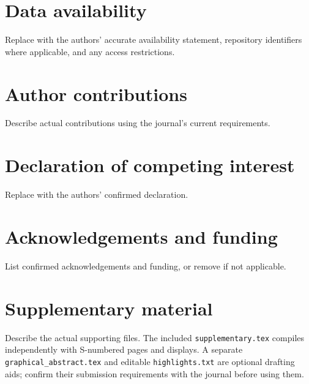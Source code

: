 \documentclass[a4paper,preprint,12pt]{elsarticle}
\begin{document}
\section*{Data availability}
Replace with the authors' accurate availability statement, repository
identifiers where applicable, and any access restrictions.
\section*{Author contributions}
Describe actual contributions using the journal's current requirements.
\section*{Declaration of competing interest}
Replace with the authors' confirmed declaration.
\section*{Acknowledgements and funding}
List confirmed acknowledgements and funding, or remove if not applicable.
\section*{Supplementary material}
Describe the actual supporting files. The included \texttt{supplementary.tex}
compiles independently with S-numbered pages and displays. A separate
\texttt{graphical\_abstract.tex} and editable \texttt{highlights.txt} are
optional drafting aids; confirm their submission requirements with the
journal before using them.



\end{document}
